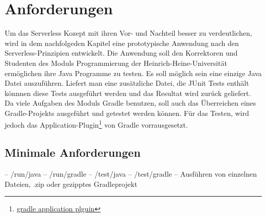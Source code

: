 \chapter{Anforderungen}
Um das Serverless Kozept mit ihren Vor- und Nachteil
besser zu verdeutlichen, wird in dem nachfolgeden Kapitel
eine prototypische Anwendung nach den Serverless-Prinzipien
entwickelt. Die Anwendung soll den Korrektoren und Studenten
des Moduls Programmierung der Heinrich-Heine-Universität
ermöglichen ihre Java Programme zu testen.
Es soll möglich sein eine einzige Java Datei auszuführen.
Liefert man eine zusätzliche Datei, die JUnit Tests enthält
könnnen diese Tests ausgeführt werden und das Resultat wird
zurück geliefert. Da viele Aufgaben des Moduls
Gradle benutzen, soll auch das Überreichen eines Gradle-Projekts
ausgeführt und getestet werden können. Für das Testen, wird jedoch
das Application-Plugin\footnote{\url{gradle application plguin}}
von Gradle vorrausgesetzt.

\section{Minimale Anforderungen}
-- /run/java
-- /run/gradle
-- /test/java
-- /test/gradle
-- Ausführen von einzelnen Dateien, .zip oder gezipptes Gradleprojekt